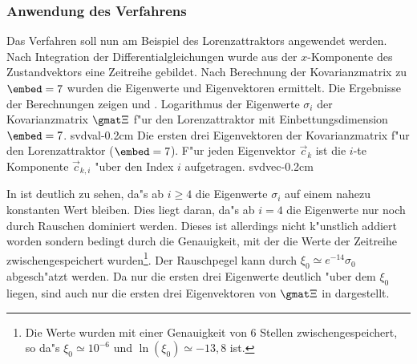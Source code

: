\subsubsection{Anwendung des Verfahrens}
Das Verfahren soll nun am Beispiel des Lorenzattraktors angewendet werden.  Nach
Integration der Differentialgleichungen wurde aus der $x$-Komponente des Zustandvektors
eine Zeitreihe gebildet.  Nach Berechnung der Kovarianzmatrix zu $\embed=7$ wurden die
Eigenwerte und Eigenvektoren ermittelt.  Die Ergebnisse der Berechnungen zeigen
 und .
{Logarithmus der Eigenwerte $\sigma_i$ der Kovarianzmatrix $\gmat \Xi$ f"ur den
Lorenzattraktor mit Einbettungsdimension $\embed=7$.
}
{svdval}{-0.2cm}
{Die ersten drei Eigenvektoren der Kovarianzmatrix f"ur den Lorenzattraktor
($\embed=7$). F"ur jeden Eigenvektor $\vec c_k$ ist die $i$-te Komponente
$\vec c_{k,i}$ "uber den Index $i$ aufgetragen.}
{svdvec}{-0.2cm}

In  ist deutlich zu sehen, da"s ab $i\geq 4$ die Eigenwerte $\sigma_i$ auf
einem nahezu konstanten Wert bleiben. Dies liegt daran, da"s ab $i=4$ die Eigenwerte nur
noch durch Rauschen dominiert werden. Dieses ist allerdings nicht k"unstlich addiert
worden sondern bedingt durch die Genauigkeit, mit der die Werte der Zeitreihe
zwischengespeichert wurden\footnote{Die Werte wurden mit einer Genauigkeit von 6 Stellen
zwischengespeichert, so da"s $\xi_0\simeq 10^{-6}$ und $\ln(\xi_0)\simeq -13,8$ ist.}. 
Der Rauschpegel kann durch $\xi_0\simeq e^{-14}\sigma_0$ abgesch"atzt werden.
Da nur die ersten drei Eigenwerte deutlich "uber dem $\xi_0$ liegen, sind auch nur die
ersten drei Eigenvektoren von $\gmat\Xi$ in 
dargestellt. 

